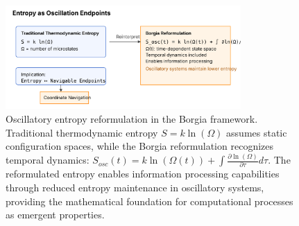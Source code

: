 

\begin{figure}[H]
\centering
\includegraphics[width=0.8\textwidth]{svgs/oscillatory_entropy_reformulation.svg}
\caption{Oscillatory entropy reformulation in the Borgia framework. Traditional thermodynamic entropy $S = k \ln(\Omega)$ assumes static configuration spaces, while the Borgia reformulation recognizes temporal dynamics: $S_{osc}(t) = k \ln(\Omega(t)) + \int \frac{\partial \ln(\Omega)}{\partial \tau} d\tau$. The reformulated entropy enables information processing capabilities through reduced entropy maintenance in oscillatory systems, providing the mathematical foundation for computational processes as emergent properties.}
\label{fig:oscillatory_entropy}
\end{figure}

